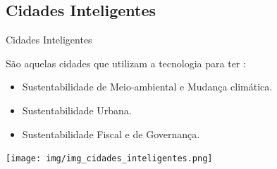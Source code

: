 \documentclass{beamer}
\begin{document}
\subsection{Cidades Inteligentes}
\begin{frame}{Cidades Inteligentes}

São aquelas cidades que utilizam a tecnologia para ter :
\begin{itemize}
 \item Sustentabilidade de Meio-ambiental e Mudança climática.
 \item Sustentabilidade Urbana.
 \item Sustentabilidade Fiscal e de Governança.
\end{itemize}

 
\begin{center} 
  \texttt{[image: img/img\_cidades\_inteligentes.png]}
\end{center}

   

\end{frame}
\end{document}
